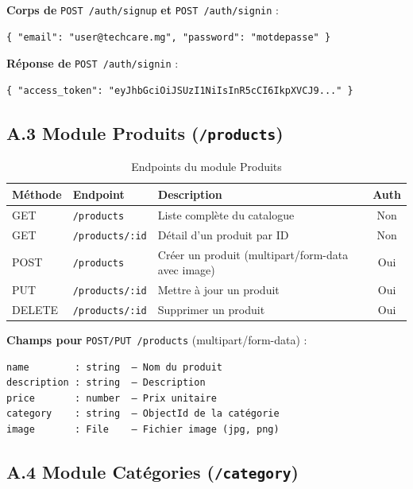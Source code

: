 \textbf{Corps de} \texttt{POST /auth/signup} \textbf{et} \texttt{POST /auth/signin} :
\begin{verbatim}
{ "email": "user@techcare.mg", "password": "motdepasse" }
\end{verbatim}

\textbf{Réponse de} \texttt{POST /auth/signin} :
\begin{verbatim}
{ "access_token": "eyJhbGciOiJSUzI1NiIsInR5cCI6IkpXVCJ9..." }
\end{verbatim}

\subsection*{A.3 Module Produits (\texttt{/products})}

\begin{table}[H]
    \centering
    \begin{tabular}{|l|l|p{5.5cm}|c|}
        \hline
        \textbf{Méthode} & \textbf{Endpoint} & \textbf{Description} & \textbf{Auth} \\
        \hline
        GET    & \texttt{/products}     & Liste complète du catalogue & Non \\
        \hline
        GET    & \texttt{/products/:id} & Détail d'un produit par ID  & Non \\
        \hline
        POST   & \texttt{/products}     & Créer un produit (multipart/form-data avec image) & Oui \\
        \hline
        PUT    & \texttt{/products/:id} & Mettre à jour un produit & Oui \\
        \hline
        DELETE & \texttt{/products/:id} & Supprimer un produit & Oui \\
        \hline
    \end{tabular}
    \caption{Endpoints du module Produits}
\end{table}

\textbf{Champs pour} \texttt{POST/PUT /products} (multipart/form-data) :
\begin{verbatim}
name        : string  — Nom du produit
description : string  — Description
price       : number  — Prix unitaire
category    : string  — ObjectId de la catégorie
image       : File    — Fichier image (jpg, png)
\end{verbatim}

\subsection*{A.4 Module Catégories (\texttt{/category})}

